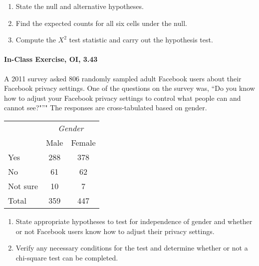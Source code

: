 \documentclass[10pt]{article}\usepackage[]{graphicx}\usepackage[]{color}
\begin{document}
\begin{enumerate}
  \itemsep0.75in
  \item State the null and alternative hypotheses.
  \item Find the expected counts for all six cells under the null.
  \item Compute the $X^2$ test statistic and carry out the hypothesis test.
  \vspace{0.5in}
\end{enumerate}

\paragraph{In-Class Exercise, OI, 3.43}
A 2011 survey asked 806 randomly sampled adult Facebook users about their Facebook privacy settings. One of the questions on the survey was, ``Do you know how to adjust your Facebook privacy settings to control what people can and cannot see?"”" The
responses are cross-tabulated based on gender. 

\begin{center}
\begin{tabular}{l c c}
    		& \multicolumn{2}{c}{\textit{Gender}} \\
\cline{2-3}
						& Male		& Female				\\
\cline{2-3}
Yes		& 288		& 378			\\
No		& 61		& 62			\\
Not sure	& 10		& 7			\\
\cline{1-3}
 Total		& 359		& 447		
\end{tabular}
\end{center}

\begin{enumerate}
  \itemsep0.75in
  \item State appropriate hypotheses to test for independence of gender and whether or not Facebook users know how to adjust their privacy settings.
  \item Verify any necessary conditions for the test and determine whether or not a chi-square test can be completed.
\end{enumerate}
\end{document}
